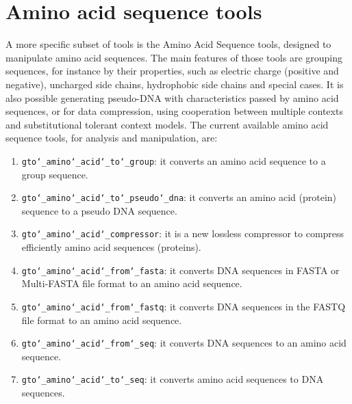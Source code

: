 \chapter{Amino acid sequence tools}
\label{seq}
A more specific subset of tools is the Amino Acid Sequence tools, designed to manipulate amino acid sequences. The main features of those tools are grouping sequences, for instance by their properties, such as electric charge (positive and negative), uncharged side chains, hydrophobic side chains and special cases. It is also possible generating pseudo-DNA with characteristics passed by amino acid sequences, or for data compression, using cooperation between multiple contexts and substitutional tolerant context models. The current available amino acid sequence tools, for analysis and manipulation, are:
\begin{enumerate}
	
\item \texttt{gto\char`_amino\char`_acid\char`_to\char`_group}: it converts an amino acid sequence to a group sequence.

\item \texttt{gto\char`_amino\char`_acid\char`_to\char`_pseudo\char`_dna}: it converts an amino acid (protein) sequence to a pseudo DNA sequence.

\item \texttt{gto\char`_amino\char`_acid\char`_compressor}: it is a new lossless compressor to compress efficiently amino acid sequences (proteins).

\item \texttt{gto\char`_amino\char`_acid\char`_from\char`_fasta}: it converts DNA sequences in FASTA or Multi-FASTA file format to an amino acid sequence.

\item \texttt{gto\char`_amino\char`_acid\char`_from\char`_fastq}: it converts DNA sequences in the FASTQ file format to an amino acid sequence.

\item \texttt{gto\char`_amino\char`_acid\char`_from\char`_seq}: it converts DNA sequences to an amino acid sequence.

\item \texttt{gto\char`_amino\char`_acid\char`_to\char`_seq}: it converts amino acid sequences to DNA sequences.

\end{enumerate}








